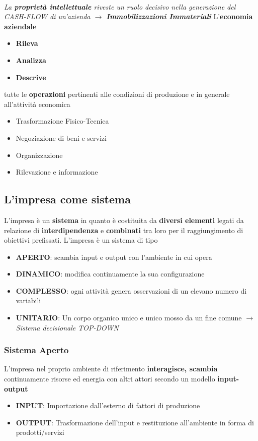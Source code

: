 \documentclass[12pt]{article}
\begin{document}
\paragraph{}\textit{La \textbf{proprietà intellettuale} riveste un ruolo decisivo nella generazione del CASH-FLOW di un'azienda $\rightarrow$ \textbf{Immobilizzazioni Immateriali}}
\newline
\newline
L'\textbf{economia aziendale}
\begin{itemize}
    \item \textbf{Rileva}
    \item \textbf{Analizza}
    \item \textbf{Descrive}
\end{itemize}
tutte le \textbf{operazioni} pertinenti alle condizioni di produzione e in generale all'attività economica
\begin{itemize}
    \item Trasformazione Fisico-Tecnica
    \item Negoziazione di beni e servizi
    \item Organizzazione
    \item Rilevazione e informazione
\end{itemize}

\subsection{L'impresa come sistema}
L'impresa è un \textbf{sistema} in quanto è costituita da \textbf{diversi elementi} legati da relazione di \textbf{interdipendenza} e \textbf{combinati} tra loro per il raggiungimento di obiettivi prefissati. L'impresa è un sistema di tipo
\begin{itemize}
    \item \textbf{APERTO}: scambia input e output con l'ambiente in cui opera
    \item \textbf{DINAMICO}: modifica continuamente la sua configurazione
    \item \textbf{COMPLESSO}: ogni attività genera osservazioni di un elevano numero di variabili
    \item \textbf{UNITARIO}: Un corpo organico unico e unico mosso da un fine comune $\rightarrow$ \textit{Sistema decisionale TOP-DOWN}
\end{itemize}

\subsubsection{Sistema Aperto}
L'impresa nel proprio ambiente di riferimento \textbf{interagisce, scambia} continuamente risorse ed energia con altri attori secondo un modello \textbf{input-output}
\begin{itemize}
    \item \textbf{INPUT}: Importazione dall'esterno di fattori di produzione
    \item \textbf{OUTPUT}: Trasformazione dell'input e restituzione all'ambiente in forma di prodotti/servizi
\end{itemize}
\end{document}
